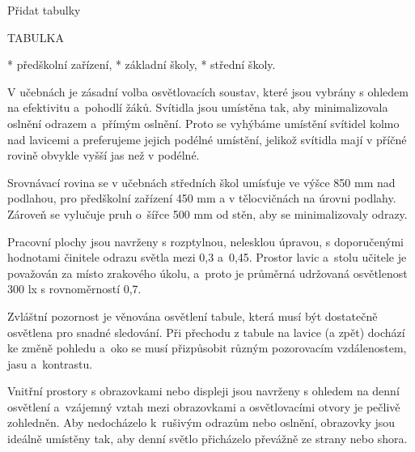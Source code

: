 Přidat tabulky 



TABULKA


\begitems
* předškolní zařízení,
* základní školy,
* střední školy.
\enditems

V učebnách je zásadní volba osvětlovacích soustav, které jsou vybrány s ohledem na efektivitu a~pohodlí žáků.
Svítidla jsou umístěna tak, aby minimalizovala oslnění odrazem a~přímým oslnění. Proto se vyhýbáme umístění svítidel kolmo nad lavicemi
a preferujeme jejich podélné umístění, jelikož svítidla mají v příčné rovině obvykle vyšší jas než v podélné.

Srovnávací rovina se v učebnách středních škol umísťuje ve výšce 850 mm nad podlahou, pro předškolní zařízení 450 mm
a v tělocvičnách na úrovni podlahy.
Zároveň se vylučuje pruh o~šířce 500 mm od stěn, aby se minimalizovaly odrazy.

Pracovní plochy jsou navrženy s rozptylnou, nelesklou úpravou, s doporučenými hodnotami činitele odrazu světla mezi 0,3 a~0,45.
Prostor lavic a~stolu učitele je považován za místo zrakového úkolu,
a~proto je průměrná udržovaná osvětlenost 300 lx s rovnoměrností 0,7.

Zvláštní pozornost je věnována osvětlení tabule, která musí být dostatečně osvětlena pro snadné sledování.
Při přechodu z tabule na lavice (a zpět) dochází ke změně pohledu a~oko se musí přizpůsobit
různým pozorovacím vzdálenostem, jasu a~kontrastu.

Vnitřní prostory s obrazovkami nebo displeji jsou navrženy s ohledem na denní osvětlení a~vzájemný vztah mezi obrazovkami
a osvětlovacími otvory je pečlivě zohledněn. Aby nedocházelo k~rušivým odrazům nebo oslnění, obrazovky jsou ideálně umístěny tak,
aby denní světlo přicházelo převážně ze strany nebo shora.











